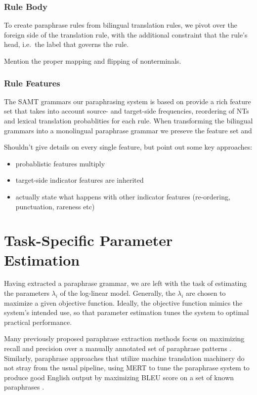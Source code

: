 \documentclass[11pt]{article}
\begin{document}
\subsubsection{Rule Body} \label{rule_body}

To create paraphrase rules from bilingual translation rules, we pivot
over the foreign side of the translation rule, with the additional
constraint that the rule's head, i.e.\ the label that governs the
rule.

Mention the proper mapping and flipping of nonterminals.

\subsubsection{Rule Features} \label{rule_features}

The SAMT grammars our paraphrasing system is based on provide a rich
feature set that takes into account source- and target-side
frequencies, reordering of NTs and lexical translation probablities
for each rule. When transforming the bilingual grammars into a
monolingual paraphrase grammar we preseve the feature set and

Shouldn't give details on every single feature, but point out some key
approaches:
\begin{itemize}
\item probablistic features multiply 
\item target-side indicator features are inherited
\item actually state what happens with other indicator features
  (re-ordering, punctuation, rareness etc)
\end{itemize}

\newpage

\section{Task-Specific Parameter Estimation} 
\label{adaptation}

Having extracted a paraphrase grammar, we are left with the task of
estimating the parameters $\lambda_i$ of the log-linear
model. Generally, the $\lambda_i$ are chosen to maximize a given
objective function. Ideally, the objective function mimics the
system's intended use, so that parameter estimation tunes the system
to optimal practical performance.

Many previously proposed paraphrase extraction methods focus on
maximizing recall and precision over a manually annotated set of
paraphrase patterns \cite{Zhao2008,Bhagat2008}.  Similarly, paraphrase
approaches that utilize machine translation machinery do not stray
from the usual pipeline, using MERT \cite{Och2003} to tune the
paraphrase system to produce good English output by maximizing BLEU
score on a set of known paraphrases \cite{Madnani2007}.
\end{document}
